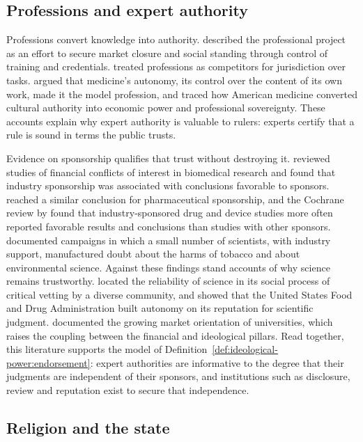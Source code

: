 \documentclass[11pt,letterpaper]{article}
\theoremstyle{definition}
\theoremstyle{remark}
\begin{document}
\subsection{Professions and expert authority}

Professions convert knowledge into authority. \citet{larson1977} described the professional project as an effort to secure market closure and social standing through control of training and credentials. \citet{abbott1988} treated professions as competitors for jurisdiction over tasks. \citet{freidson1970} argued that medicine's autonomy, its control over the content of its own work, made it the model profession, and \citet{starr1982} traced how American medicine converted cultural authority into economic power and professional sovereignty. These accounts explain why expert authority is valuable to rulers: experts certify that a rule is sound in terms the public trusts.

Evidence on sponsorship qualifies that trust without destroying it. \citet{bekelman2003} reviewed studies of financial conflicts of interest in biomedical research and found that industry sponsorship was associated with conclusions favorable to sponsors. \citet{lexchin2003} reached a similar conclusion for pharmaceutical sponsorship, and the Cochrane review by \citet{lundh2017} found that industry-sponsored drug and device studies more often reported favorable results and conclusions than studies with other sponsors. \citet{oreskes2010} documented campaigns in which a small number of scientists, with industry support, manufactured doubt about the harms of tobacco and about environmental science. Against these findings stand accounts of why science remains trustworthy. \citet{oreskes2019} located the reliability of science in its social process of critical vetting by a diverse community, and \citet{carpenter2010} showed that the United States Food and Drug Administration built autonomy on its reputation for scientific judgment. \citet{slaughter2004} documented the growing market orientation of universities, which raises the coupling between the financial and ideological pillars. Read together, this literature supports the model of Definition~\ref{def:ideological-power:endorsement}: expert authorities are informative to the degree that their judgments are independent of their sponsors, and institutions such as disclosure, review and reputation exist to secure that independence.

\subsection{Religion and the state}
\end{document}
